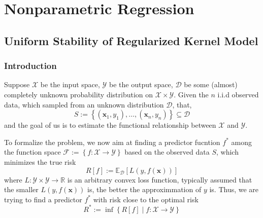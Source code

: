 \chapter{Nonparametric Regression}

\section{Uniform Stability of Regularized Kernel Model}

\subsection{Introduction}

Suppose $\mathcal{X}$ be the input space, $\mathcal{Y}$ be the output space, $\mathcal{D}$ be some (almost) completely unknown probability distribution on $\mathcal{X}\times\mathcal{Y}$. Given the $n$ i.i.d observed data, which sampled from an unknown distribution $\mathcal{D}$, that,
\begin{equation}
	S:=\left\{(\mathbf{x}_{1},y_{1}),\ldots,(\mathbf{x}_{n},y_{n})\right\}\subseteq\mathcal{D}
\end{equation}
and the goal of us is to estimate the functional relationship between $\mathcal{X}$ and $\mathcal{Y}$.

To formalize the problem, we now aim at finding a predictor fucntion $f^{*}$ among the function space $\mathcal{F}:=\left\{f:\mathcal{X}\rightarrow\mathcal{Y}\right\}$ based on the observed data $S$, which minimizes the true risk
\begin{equation} \label{eq:true-risk}
	R[f]:=\mathbb{E}_{\mathcal{D}}\left[L\left(y,f(\mathbf{x})\right)\right]
\end{equation}
where $L:\mathcal{Y}\times\mathcal{Y}\rightarrow\mathbb{R}$ is an arbitrary convex loss function, typically assumed that the smaller $L\left(y,f(\mathbf{x})\right)$ is, the better the approximmation of $y$ is. Thus, we are trying to find a predictor $f^{*}$ with risk close to the optimal risk
\begin{equation}
	R^{*}:=\inf\left\{R[f]\mid f:\mathcal{X}\rightarrow\mathcal{Y}\right\}
\end{equation}


